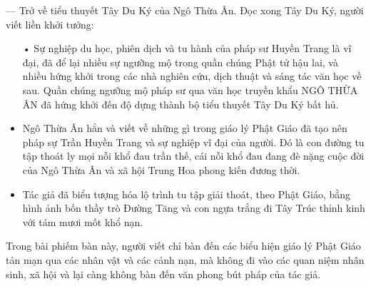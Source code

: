 — Trở về tiểu thuyết Tây Du Ký của Ngô Thừa Ân. Đọc xong Tây Du Ký, người viết liền khởi tưởng:

\begin{itemize}
   \item[•] Sự nghiệp du học, phiên dịch và tu hành của pháp sư Huyền Trang là vĩ đại, đã để lại nhiều sự ngưỡng mộ trong quần chúng Phật tử hậu lai, và nhiều hứng khởi trong các nhà nghiên cứu, dịch thuật và sáng tác văn học về sau. Quần chúng ngưỡng mộ pháp sư qua văn học truyền khẩu NGÔ THỪA ÂN đã hứng khởi đến độ dựng thành bộ tiểu thuyết Tây Du Ký bất hủ.

   \item Ngô Thừa Ân hẳn và viết về những gì trong giáo lý Phật Giáo đã tạo nên pháp sự Trần Huyền Trang và sự nghiệp vĩ đại của người. Đó là con đường tu tập thoát ly mọi nỗi khổ đau trần thế, cái nỗi khổ đau đang đè nặng cuộc đời của Ngô Thừa Ân và xã hội Trung Hoa phong kiến đương thời.

   \item Tác giả đã biểu tượng hóa lộ trình tu tập giải thoát, theo Phật Giáo, bằng hình ảnh bốn thầy trò Đường Tăng và con ngựa trắng đi Tây Trúc thỉnh kinh với tám mươi mốt khổ nạn.
\end{itemize}

Trong bài phiếm bàn này, người viết chỉ bàn đến các biểu hiện giáo lý Phật Giáo tản mạn qua các nhân vật và các cảnh nạn, mà không đi vào các quan niệm nhân sinh, xã hội và lại càng không bàn đến văn phong bút pháp của tác giả.

